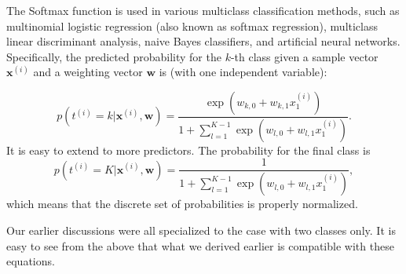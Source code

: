 \documentclass[%
oneside,                 %
final,                   %
10pt]{article}
\begin{document}
The Softmax function is used in various multiclass classification
methods, such as multinomial logistic regression (also known as
softmax regression), multiclass linear discriminant analysis, naive
Bayes classifiers, and artificial neural networks.  Specifically, the predicted probability for the $k$-th class given a sample
vector $\boldsymbol{x}^{(i)}$ and a weighting vector $\boldsymbol{w}$ is (with one independent variable):

\[
p(t^{(i)}=k\vert \boldsymbol{x}^{(i)},  \boldsymbol{w} ) = \frac{\exp{(w_{k,0}+w_{k,1}x_1^{(i)})}} {1+\sum_{l=1}^{K-1}\exp{(w_{l,0}+w_{l,1}x_1^{(i)})}}.
\]
It is easy to extend to more predictors. The probability for the final class is 
\[
p(t^{(i)}=K\vert \boldsymbol{x}^{(i)},  \boldsymbol{w} ) = \frac{1} {1+\sum_{l=1}^{K-1}\exp{(w_{l,0}+w_{l,1}x_1^{(i)})}},
\]
which means that the discrete set of probabilities is properly normalized. 

Our earlier discussions were all specialized to
the case with two classes only. It is easy to see from the above that
what we derived earlier is compatible with these equations.


\end{document}
